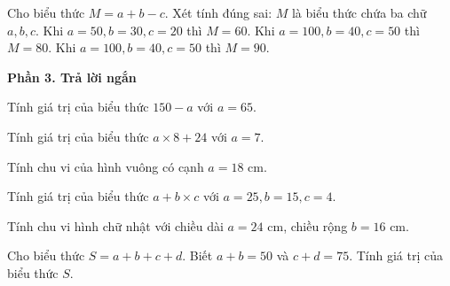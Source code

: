 \begin{ex} %
Cho biểu thức $M = a + b - c$. Xét tính đúng sai:
\choiceTF
{\True $M$ là biểu thức chứa ba chữ $a, b, c$.}
{\True Khi $a = 50, b = 30, c = 20$ thì $M = 60$.}
{Khi $a = 100, b = 40, c = 50$ thì $M = 80$.}
{\True Khi $a = 100, b = 40, c = 50$ thì $M = 90$.}
\end{ex}

\textbf{Phần 3. Trả lời ngắn}

\begin{ex} %
Tính giá trị của biểu thức $150 - a$ với $a = 65$.
\end{ex}

\begin{ex} %
Tính giá trị của biểu thức $a \times 8 + 24$ với $a = 7$.
\end{ex}

\begin{ex} %
Tính chu vi của hình vuông có cạnh $a = 18\text{ cm}$.
\end{ex}

\begin{ex} %
Tính giá trị của biểu thức $a + b \times c$ với $a = 25, b = 15, c = 4$.
\end{ex}

\begin{ex} %
Tính chu vi hình chữ nhật với chiều dài $a = 24\text{ cm}$, chiều rộng $b = 16\text{ cm}$.
\end{ex}

\begin{ex} %
Cho biểu thức $S = a + b + c + d$. Biết $a + b = 50$ và $c + d = 75$. Tính giá trị của biểu thức $S$.
\end{ex}
